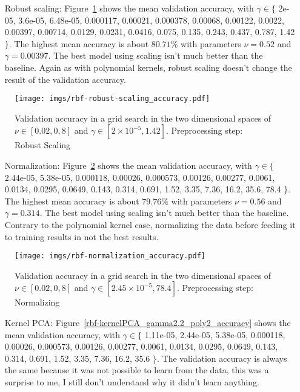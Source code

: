 \documentclass[format=acmtog]{acmart}
\begin{document}
\begin{itemize}
  \item[Robust scaling:] Figure~\ref{rbf-robust-scaling_accuracy} shows the mean validation accuracy,
  with $\gamma \in \{$ 2e-05, 3.6e-05, 6.48e-05, 0.000117, 0.00021, 0.000378, 0.00068,
  0.00122, 0.0022, 0.00397, 0.00714, 0.0129, 0.0231, 0.0416, 0.075, 0.135, 0.243, 0.437,
  0.787, 1.42 $\}$.
  The highest mean accuracy is about $80.71\%$ with parameters $\nu = 0.52$ and $\gamma = 0.00397$.
  The best model using scaling isn't much better than the baseline. Again as with
  polynomial kernels, robust scaling doesn't change the result of the validation accuracy.
\end{itemize}

\begin{figure}
\centering
\texttt{[image: imgs/rbf-robust-scaling\_accuracy.pdf]}
\caption{Validation accuracy in a grid search in the two dimensional
spaces of \(\nu \in [0.02,0,8]\) and
\(\gamma \in [2\times{}10^{-5}, 1.42]\). Preprocessing step: Robust
Scaling \label{rbf-robust-scaling_accuracy}}
\end{figure}

\begin{itemize}
  \item[Normalization:] Figure~\ref{rbf-normalization_accuracy} shows the mean validation accuracy,
  with $\gamma \in \{$ 2.44e-05, 5.38e-05, 0.000118, 0.00026, 0.000573, 0.00126, 0.00277,
  0.0061, 0.0134, 0.0295, 0.0649, 0.143, 0.314, 0.691, 1.52, 3.35, 7.36, 16.2, 35.6, 78.4 $\}$.
  The highest mean accuracy is about $79.76\%$ with parameters $\nu = 0.56$ and $\gamma = 0.314$.
  The best model using scaling isn't much better than the baseline. Contrary to the
  polynomial kernel case, normalizing the data before feeding it to training results in
  not the best results.
\end{itemize}

\begin{figure}
\centering
\texttt{[image: imgs/rbf-normalization\_accuracy.pdf]}
\caption{Validation accuracy in a grid search in the two dimensional
spaces of \(\nu \in [0.02,0,8]\) and
\(\gamma \in [2.45\times{}10^{-5}, 78.4]\). Preprocessing step:
Normalizing \label{rbf-normalization_accuracy}}
\end{figure}

\begin{itemize}
  \item[Kernel PCA:] Figure~\ref{rbf-kernelPCA_gamma2.2_poly2_accuracy} shows the mean validation accuracy,
  with $\gamma \in \{$ 1.11e-05, 2.44e-05, 5.38e-05, 0.000118, 0.00026, 0.000573, 0.00126,
  0.00277, 0.0061, 0.0134, 0.0295, 0.0649, 0.143, 0.314, 0.691, 1.52, 3.35, 7.36, 16.2,
  35.6 $\}$.
  The validation accuracy is always the same because it was not possible to learn from the
  data, this was a surprise to me, I still don't understand why it didn't learn anything.
\end{itemize}
\end{document}
